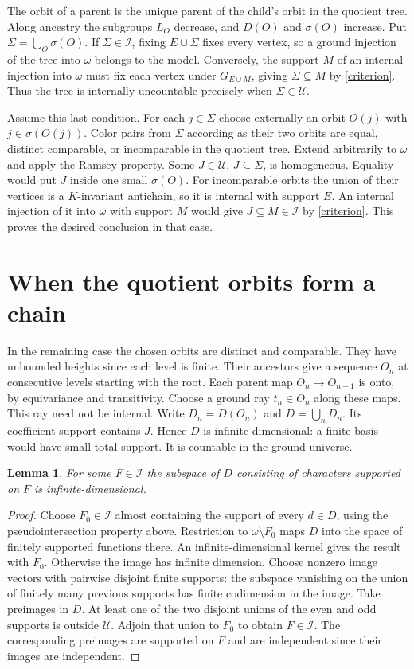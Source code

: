 \documentclass[11pt]{article}
\newtheorem{lemma}[theorem]{Lemma}
\newcommand{\II}{\mathcal I}
\newcommand{\UU}{\mathcal U}
\begin{document}
The orbit of a parent is the unique parent of the child's orbit in the quotient tree. Along ancestry the subgroups $L_O$ decrease, and $D(O)$ and $\sigma(O)$ increase. Put $\Sigma=\bigcup_O\sigma(O)$. If $\Sigma\in\II$, fixing $E\cup\Sigma$ fixes every vertex, so a ground injection of the tree into $\omega$ belongs to the model. Conversely, the support $M$ of an internal injection into $\omega$ must fix each vertex under $G_{E\cup M}$, giving $\Sigma\subseteq M$ by \eqref{criterion}. Thus the tree is internally uncountable precisely when $\Sigma\in\UU$.

Assume this last condition. For each $j\in\Sigma$ choose externally an orbit $O(j)$ with $j\in\sigma(O(j))$. Color pairs from $\Sigma$ according as their two orbits are equal, distinct comparable, or incomparable in the quotient tree. Extend arbitrarily to $\omega$ and apply the Ramsey property. Some $J\in\UU$, $J\subseteq\Sigma$, is homogeneous. Equality would put $J$ inside one small $\sigma(O)$. For incomparable orbits the union of their vertices is a $K$-invariant antichain, so it is internal with support $E$. An internal injection of it into $\omega$ with support $M$ would give $J\subseteq M\in\II$ by \eqref{criterion}. This proves the desired conclusion in that case.

\section{When the quotient orbits form a chain}
In the remaining case the chosen orbits are distinct and comparable. They have unbounded heights since each level is finite. Their ancestors give a sequence $O_n$ at consecutive levels starting with the root. Each parent map $O_n\to O_{n-1}$ is onto, by equivariance and transitivity. Choose a ground ray $t_n\in O_n$ along these maps. This ray need not be internal. Write $D_n=D(O_n)$ and $D=\bigcup_n D_n$. Its coefficient support contains $J$. Hence $D$ is infinite-dimensional: a finite basis would have small total support. It is countable in the ground universe.

\begin{lemma}\label{characters}
For some $F\in\II$ the subspace of $D$ consisting of characters supported on $F$ is infinite-dimensional.
\end{lemma}
\begin{proof}
Choose $F_0\in\II$ almost containing the support of every $d\in D$, using the pseudointersection property above. Restriction to $\omega\setminus F_0$ maps $D$ into the space of finitely supported functions there. An infinite-dimensional kernel gives the result with $F_0$. Otherwise the image has infinite dimension. Choose nonzero image vectors with pairwise disjoint finite supports: the subspace vanishing on the union of finitely many previous supports has finite codimension in the image. Take preimages in $D$. At least one of the two disjoint unions of the even and odd supports is outside $\UU$. Adjoin that union to $F_0$ to obtain $F\in\II$. The corresponding preimages are supported on $F$ and are independent since their images are independent.
\end{proof}
\end{document}
